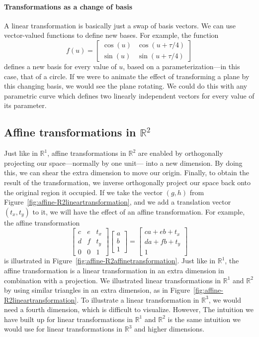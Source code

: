 \paragraph{Transformations as a change of basis}

A linear transformation is basically just a swap of basis vectors.
We can use vector-valued functions to define new bases. For 
example, the function 
\[
    f(u)=
    \begin{bmatrix}
        \cos(u) & \cos(u+\tau/4) \\
        \sin(u) & \sin(u+\tau/4)
    \end{bmatrix}
\]
defines a new basis for every value of \(u\), based on a 
parameterization---in this case, that of a circle. 
If we were to animate the effect of transforming a plane 
by this changing basis, we would see the plane rotating.
We could do this with any parametric curve which defines
two linearly independent vectors for every value of its parameter.

\subsection{Affine transformations in \texorpdfstring{\(\mathbb{R}^{2}\)}{R2}}

Just like in \(\mathbb{R}^{1}\), affine transformations in \(\mathbb{R}^{2}\)
are enabled by orthogonally projecting our space---normally by one unit---%
into a new dimension. By doing this, we can shear the extra dimension to
move our origin. Finally, to obtain the result of the transformation, we inverse 
orthogonally project our space back onto the original region it occupied.
If we take the vector \((g,h)\) from Figure~\ref{fig:affine-R2lineartransformation}, 
and we add a translation vector \((t_x,t_y)\) to it, we will have the 
effect of an affine transformation. For example, the affine transformation 
\[
\begin{bmatrix}
c & e & t_x \\
d & f & t_y \\
0 & 0 & 1
\end{bmatrix}
\begin{bmatrix}
a \\
b \\
1
\end{bmatrix}
=
\begin{bmatrix}
c a + e b + t_x \\
d a + f b + t_y \\
1
\end{bmatrix}
\]
is illustrated in Figure~\ref{fig:affine-R2affinetransformation}.
Just like in \(\mathbb{R}^{1}\), the affine transformation is a linear transformation
in an extra dimension in combination with a projection. We illustrated linear transformations in 
\(\mathbb{R}^{1}\) and \(\mathbb{R}^{2}\) by using similar triangles in an extra dimension, as in 
Figure~\ref{fig:affine-R2lineartransformation}. To illustrate a linear 
transformation in \(\mathbb{R}^{3}\), we would need a fourth dimension,
which is difficult to visualize. However, The intuition we have built up for linear transformations in \(\mathbb{R}^{1}\) and \(\mathbb{R}^{2}\)
is the same intuition we would use for linear transformations in \(\mathbb{R}^{3}\) and higher dimensions.

